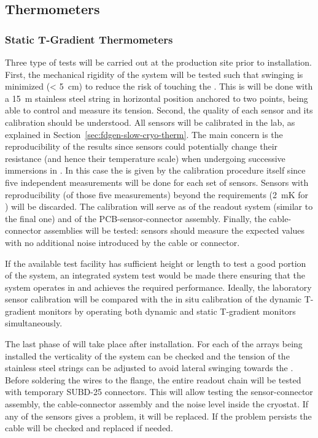 \subsection{Thermometers}
\label{sec:fdgen-slow-cryo-qc-th}

\subsubsection{Static T-Gradient Thermometers}
\label{sec:fdgen-slow-cryo-qc-thst}


Three type of tests will be carried out at the production site prior to installation. First, the mechanical rigidity of the system will be tested such that swinging is minimized (< \SI{5}{cm})
to reduce the risk of touching the . This is will be done with a \SI{15}{m} stainless steel string in horizontal position anchored to two points, being able to control and measure its tension. 
Second, the quality of each sensor and its calibration should be understood. All sensors will be calibrated in the lab, as explained in Section~\ref{sec:fdgen-slow-cryo-therm}.
The main concern is the reproducibility of the results since sensors could potentially change their resistance (and hence their temperature scale)
when undergoing successive immersions in \lar{}. In this case the  is given by the calibration procedure itself since five independent measurements
will be done for each set of sensors. Sensors with reproducibility (\rms of those five measurements) beyond the requirements (\SI{2}{mK} for ) will be discarded.  
The calibration will serve as  of the readout system (similar to the final one) and of the PCB-sensor-connector assembly. Finally, the cable-connector assemblies will
be tested: sensors should measure the expected values with no additional noise introduced by the cable or connector. 

If the available \lar test facility has sufficient height or length to test a good portion of the system, an integrated system test would be made there ensuring that the system
operates in \lar and achieves the required performance. Ideally, the laboratory sensor calibration will be compared with the in situ calibration
of the dynamic T-gradient monitors by operating both dynamic and static T-gradient monitors simultaneously.   

The last phase of  will take place after installation. For each of the arrays being installed
the verticality of the system can be checked and the tension of the stainless steel strings can be adjusted to avoid lateral swinging towards the . 
Before soldering the wires to the flange, the entire readout chain will be tested with temporary SUBD-25 connectors. 
This will allow testing the sensor-connector assembly, the cable-connector assembly and the noise level inside the cryostat.
If any of the sensors gives a problem, it will be replaced. If the problem persists the cable will be checked and replaced if needed.



